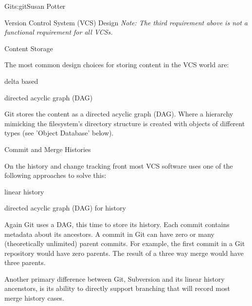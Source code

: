 \begin{aosachapter}{Git}{s:git}{Susan Potter}
\begin{aosasect1}{Version Control System (VCS) Design}
\emph{Note: The third requirement above is not a functional requirement for
all VCSs.}

\begin{aosasect2}{Content Storage}

The most common design choices for storing content in the VCS world are:
\begin{aosaitemize}
  \item delta based
  \item directed acyclic graph (DAG)
\end{aosaitemize}

Git stores the content as a directed acyclic graph (DAG). Where a hierarchy
mimicking the filesystem's directory structure is created with objects of
different types (see 'Object Database' below).

\end{aosasect2}
\begin{aosasect2}{Commit and Merge Histories}

On the history and change tracking front most VCS software uses one of
the following approaches to solve this:
\begin{aosaitemize}
  \item linear history
  \item directed acyclic graph (DAG) for history
\end{aosaitemize}

Again Git uses a DAG, this time to store its history. Each commit contains
metadata about its ancestors. A commit in Git can have zero or many
(theoretically unlimited) parent commits. For example, the first commit
in a Git repository would have zero parents. The result of a three way merge
would have three parents.

Another primary difference between Git, Subversion and its linear history
ancenstors, is its ability to directly support branching that will record
most merge history cases.



\end{aosasect2}
\end{aosasect1}
\end{aosachapter}
